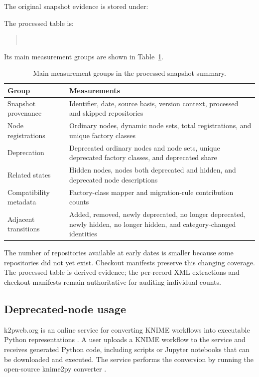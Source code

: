 \documentclass[runningheads]{llncs}
\begin{document}
The original snapshot evidence is stored under:
\begin{quote}
\end{quote}
The processed table is:
\begin{quote}
\\
\end{quote}
Its main measurement groups are shown in Table~\ref{tab:summary-columns}.

\begin{table}
\centering
\caption{Main measurement groups in the processed snapshot summary.}
\label{tab:summary-columns}
\small
\begin{tabular}{p{}p{}}
\toprule
Group & Measurements \\
\midrule
Snapshot provenance & Identifier, date, source basis, version context,
processed and skipped repositories \\
Node registrations & Ordinary nodes, dynamic node sets, total registrations,
and unique factory classes \\
Deprecation & Deprecated ordinary nodes and node sets, unique deprecated factory
classes, and deprecated share \\
Related states & Hidden nodes, nodes both deprecated and hidden, and deprecated
node descriptions \\
Compatibility metadata & Factory-class mapper and migration-rule contribution
counts \\
Adjacent transitions & Added, removed, newly deprecated, no longer deprecated,
newly hidden, no longer hidden, and category-changed identities \\
\bottomrule
\end{tabular}
\end{table}

The number of repositories available at early dates is smaller because some
repositories did not yet exist. Checkout manifests preserve this changing
coverage. The processed table is derived evidence; the per-record XML
extractions and checkout manifests remain authoritative for auditing individual
counts.

\subsection{Deprecated-node usage}

k2pweb.org is an online service for converting KNIME workflows into executable
Python representations \cite{K2PWeb2026}. A user uploads a KNIME workflow to
the service and receives generated Python code, including scripts or Jupyter
notebooks that can be downloaded and executed. The service performs the
conversion by running the open-source knime2py converter
\cite{KaplanKnime2py2026}.
\end{document}
